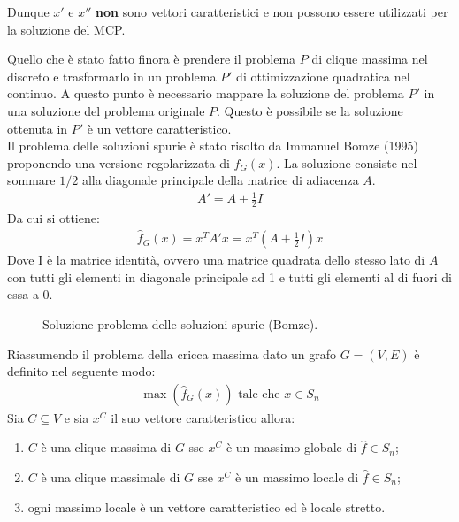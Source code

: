 Dunque $x'$ e $x''$ \textbf{non} sono vettori caratteristici e non possono essere utilizzati per la soluzione del MCP.

\newpage

Quello che è stato fatto finora è prendere il problema $P$ di clique massima nel discreto e trasformarlo in un problema $P'$ di ottimizzazione quadratica nel continuo. A questo punto è necessario mappare la soluzione del problema $P'$ in una soluzione del problema originale $P$.  Questo è possibile se la soluzione ottenuta in $P'$ è un vettore caratteristico.\\

Il problema delle soluzioni spurie è stato risolto da Immanuel Bomze (1995) proponendo una versione regolarizzata di $f_G(x)$. La soluzione consiste nel sommare $1/2$ alla diagonale principale della matrice di adiacenza $A$.
\begin{align*}
    A' = A + \frac{1}{2} I
\end{align*}
Da cui si ottiene:
\begin{align*}
    \hat{f}_G(x) = x^T A' x = x^T \left( A + \frac{1}{2} I \right) x 
\end{align*}
Dove I è la matrice identità, ovvero una matrice quadrata dello stesso lato di $A$ con tutti gli elementi in diagonale principale ad 1 e tutti gli elementi al di fuori di essa a 0.\\


\begin{figure}[h!]
    \centering
    \caption{Soluzione problema delle soluzioni spurie (Bomze).}
\end{figure}

Riassumendo il problema della cricca massima dato un grafo $G = (V, E)$ è definito nel seguente modo:
\begin{align*}
	\max(\hat{f}_G(x)) \text{ tale che } x \in S_n
\end{align*}
Sia $C \subseteq V$ e sia $x^C$ il suo vettore caratteristico allora:
\begin{enumerate}
	\item $C$ è una clique massima di $G$ sse $x^C$ è un massimo globale di $\hat{f} \in S_n$;
	\item $C$ è una clique massimale di $G$ sse $x^C$ è un massimo locale di $\hat{f} \in S_n$;
	\item ogni massimo locale è un vettore caratteristico ed è locale stretto. 
\end{enumerate}

